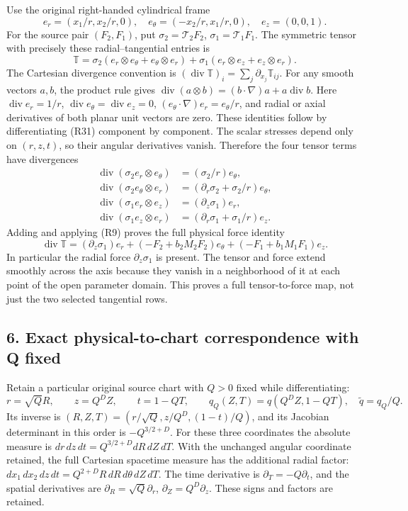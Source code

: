 \documentclass[10pt,a4paper]{article}
\begin{document}
Use the original right-handed cylindrical frame \[
e_r=(x_1/r,x_2/r,0),\quad e_\theta=(-x_2/r,x_1/r,0),\quad e_z=(0,0,1).
\tag{R31}
\] For the source pair \((F_2,F_1)\), put \(\sigma_2=\mathcal T_2F_2\), \(\sigma_1=\mathcal T_1F_1\). The symmetric tensor with precisely these radial--tangential entries is \[
\mathbb T=\sigma_2(e_r\otimes e_\theta+e_\theta\otimes e_r)
+\sigma_1(e_r\otimes e_z+e_z\otimes e_r).
\tag{R32}
\] The Cartesian divergence convention is \((\operatorname{div}\mathbb T)_i=\sum_j\partial_{x_j}\mathbb T_{ij}\). For any smooth vectors \(a,b\), the product rule gives \(\operatorname{div}(a\otimes b)=(b\cdot\nabla)a+a\operatorname{div}b\). Here \(\operatorname{div}e_r=1/r\), \(\operatorname{div}e_\theta=\operatorname{div}e_z=0\), \((e_\theta\cdot\nabla)e_r=e_\theta/r\), and radial or axial derivatives of both planar unit vectors are zero. These identities follow by differentiating (R31) component by component. The scalar stresses depend only on \((r,z,t)\), so their angular derivatives vanish. Therefore the four tensor terms have divergences \[
\begin{aligned}
\operatorname{div}(\sigma_2e_r\otimes e_\theta)&=(\sigma_2/r)e_\theta,\\
\operatorname{div}(\sigma_2e_\theta\otimes e_r)&=(\partial_r\sigma_2+\sigma_2/r)e_\theta,\\
\operatorname{div}(\sigma_1e_r\otimes e_z)&=(\partial_z\sigma_1)e_r,\\
\operatorname{div}(\sigma_1e_z\otimes e_r)&=(\partial_r\sigma_1+\sigma_1/r)e_z.
\end{aligned}
\tag{R33}
\] Adding and applying (R9) proves the full physical force identity \[
\operatorname{div}\mathbb T
=(\partial_z\sigma_1)e_r
 +(-F_2+b_2M_2F_2)e_\theta
 +(-F_1+b_1M_1F_1)e_z.
\tag{R34}
\] In particular the radial force \(\partial_z\sigma_1\) is present. The tensor and force extend smoothly across the axis because they vanish in a neighborhood of it at each point of the open parameter domain. This proves a full tensor-to-force map, not just the two selected tangential rows.

\subsection{6. Exact physical-to-chart correspondence with Q fixed}\label{nsupstream:radial_stress_reconstruction_audit:exact-physical-to-chart-correspondence-with-q-fixed}

Retain a particular original source chart with \(Q>0\) fixed while differentiating: \[
r=\sqrt Q R,\qquad z=Q^D Z,\qquad t=1-QT,\qquad
q_Q(Z,T)=q(Q^DZ,1-QT),\quad \widetilde q=q_Q/Q.
\tag{R35}
\] Its inverse is \((R,Z,T)=(r/\sqrt Q,z/Q^D,(1-t)/Q)\), and its Jacobian determinant in this order is \(-Q^{3/2+D}\). For these three coordinates the absolute measure is \(dr\,dz\,dt=Q^{3/2+D}dR\,dZ\,dT\). With the unchanged angular coordinate retained, the full Cartesian spacetime measure has the additional radial factor: \(dx_1\,dx_2\,dz\,dt=Q^{2+D}R\,dR\,d\theta\,dZ\,dT\). The time derivative is \(\partial_T=-Q\partial_t\), and the spatial derivatives are \(\partial_R=\sqrt Q\partial_r\), \(\partial_Z=Q^D\partial_z\). These signs and factors are retained.
\end{document}
